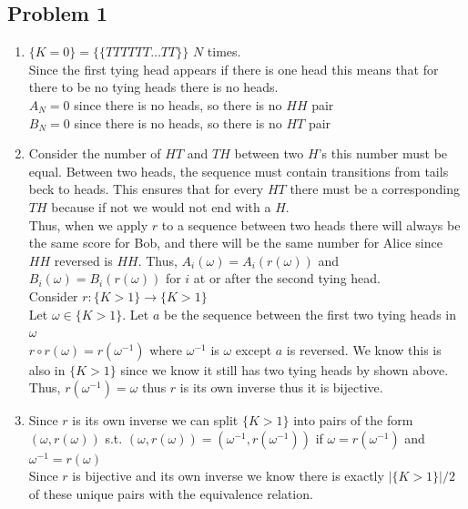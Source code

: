 \documentclass[12pt, letterpaper]{article}
\theoremstyle{definition}
\begin{document}
\pagestyle{fancy}
\fancyhf{}
\fancyhead[ROE]{\thepage}

\subsection*{Problem 1}
\begin{enumerate}
    \item $\{K=0\}=\{\{TTTTTT\dots TT\}\}$ $N$ times.\\
    Since the first tying head appears if there is one head this means that for there to be no tying heads there is no heads.\\
    $A_N=0$ since there is no heads, so there is no $HH$ pair\\
    $B_N=0$ since there is no heads, so there is no $HT$ pair
    \item Consider the number of $HT$ and $TH$ between two $H$'s this number must be equal.
    Between two  heads, the sequence must contain transitions from tails beck to heads. This ensures that for every $HT$ there must be a corresponding $TH$ because if not we would not end with a $H$.\\
    Thus, when we apply $r$ to a sequence between two heads there will always be the same score for Bob, and there will be the same number for Alice since $HH$ reversed is $HH$.
    Thus, $A_i(\omega)=A_i(r(\omega))$ and $B_i(\omega)=B_i(r(\omega))$ for $i$ at or after the second tying head.\\
    Consider $r : \{K > 1\} \rightarrow \{K > 1\}$\\
    Let $\omega \in \{K > 1\}$. Let $a$ be the sequence between the first two tying heads in $\omega$\\
    $r\circ r(\omega)=r (\omega^{-1})$ where $\omega^{-1}$ is $\omega$ except $a$ is reversed. We know this is also in $\{K > 1\}$ since we know it still has two tying heads by shown above.\\
    Thus, $r(\omega^{-1})=\omega$ thus $r$ is its own inverse thus it is bijective.
    \item Since $r$ is its own inverse we can split $\{K > 1\}$ into pairs of the form\\ 
    $(\omega, r(\omega))$ s.t. $(\omega, r(\omega)) = (\omega^{-1}, r(\omega^{-1}))$ if $\omega=r(\omega^{-1})$ and $\omega^{-1}=r(\omega)$\\
    Since $r$ is bijective and its own inverse we know there is exactly $|\{K > 1\}|/2$ of these unique pairs with the equivalence relation.\\

\end{enumerate}
\end{document}
